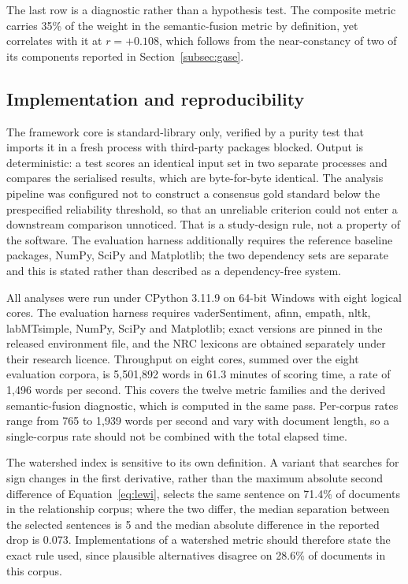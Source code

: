 \documentclass[fleqn,10pt]{wlscirep}
\begin{document}
The last row is a diagnostic rather than a hypothesis test. The composite metric carries 35\% of the weight in the semantic-fusion metric by definition, yet correlates with it at $r=+0.108$, which follows from the near-constancy of two of its components reported in Section~\ref{subsec:gase}.

\subsection{Implementation and reproducibility}\label{subsec:repro}

The framework core is standard-library only, verified by a purity test that imports it in a fresh process with third-party packages blocked. Output is deterministic: a test scores an identical input set in two separate processes and compares the serialised results, which are byte-for-byte identical. The analysis pipeline was configured not to construct a consensus gold standard below the prespecified reliability threshold, so that an unreliable criterion could not enter a downstream comparison unnoticed. That is a study-design rule, not a property of the software. The evaluation harness additionally requires the reference baseline packages, NumPy, SciPy and Matplotlib; the two dependency sets are separate and this is stated rather than described as a dependency-free system.

All analyses were run under CPython 3.11.9 on 64-bit Windows with eight logical cores. The evaluation harness requires vaderSentiment, afinn, empath, nltk, labMTsimple, NumPy, SciPy and Matplotlib; exact versions are pinned in the released environment file, and the NRC lexicons are obtained separately under their research licence. Throughput on eight cores, summed over the eight evaluation corpora, is 5{,}501{,}892 words in 61.3 minutes of scoring time, a rate of 1{,}496 words per second. This covers the twelve metric families and the derived semantic-fusion diagnostic, which is computed in the same pass. Per-corpus rates range from 765 to 1{,}939 words per second and vary with document length, so a single-corpus rate should not be combined with the total elapsed time.

The watershed index is sensitive to its own definition. A variant that searches for sign changes in the first derivative, rather than the maximum absolute second difference of Equation~\eqref{eq:lewi}, selects the same sentence on 71.4\% of documents in the relationship corpus; where the two differ, the median separation between the selected sentences is 5 and the median absolute difference in the reported drop is 0.073. Implementations of a watershed metric should therefore state the exact rule used, since plausible alternatives disagree on 28.6\% of documents in this corpus.
\end{document}
